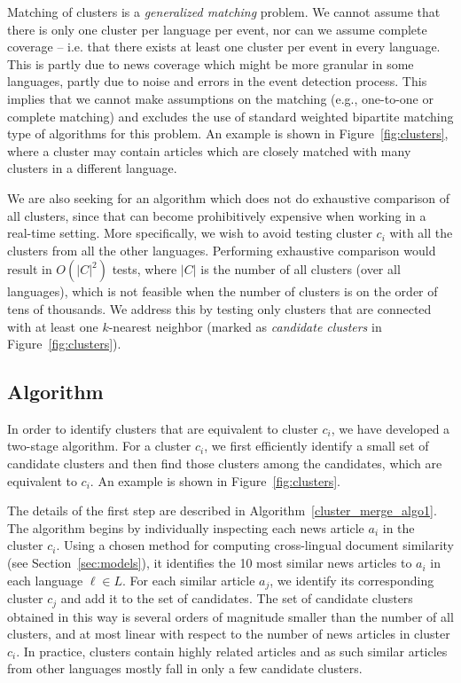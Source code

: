 \documentclass[twoside,11pt]{article}
\begin{document}
Matching of clusters is a \emph{generalized matching} problem. We cannot assume that there is only one cluster per language per event, nor can we assume complete coverage -- i.e. that there exists at least one cluster per event in every language. This is partly due to news coverage which might be more granular in some languages, partly due to noise and errors in the event detection process. This implies that we cannot make assumptions on the matching (e.g., one-to-one or complete matching) and excludes the use of standard weighted bipartite matching type of algorithms for this problem. An example is shown in Figure~\ref{fig:clusters}, where a cluster may contain articles which are closely matched with many clusters in a different language.

We are also seeking for an algorithm which does not do exhaustive comparison of all clusters, since that can become prohibitively expensive when working in a real-time setting. More specifically, we wish to avoid testing cluster $c_i$ with all the clusters from all the other languages. Performing exhaustive comparison would result in $O(|C|^2)$ tests, where $|C|$ is the number of all clusters (over all languages), which is not feasible when the number of clusters is on the order of tens of thousands. We address this by testing only clusters that are connected with at least one $k$-nearest neighbor (marked as \emph{candidate clusters} in Figure~\ref{fig:clusters}).

\subsection{Algorithm}\label{algo:features}

In order to identify clusters that are equivalent to cluster $c_i$, we have developed a two-stage algorithm. For a cluster $c_i$, we first efficiently identify a small set of candidate clusters and then find those clusters among the candidates, which are equivalent to $c_i$. An example is  shown in  Figure~\ref{fig:clusters}.

The details of the first step are described in Algorithm~\ref{cluster_merge_algo1}. The algorithm begins by individually inspecting each news article $a_i$ in the cluster $c_i$. Using a chosen method for computing cross-lingual document similarity (see Section~\ref{sec:models}), it identifies the 10 most similar news articles to $a_i$ in each language $\ell \in L$. For each similar article $a_j$, we identify its corresponding  cluster $c_j$ and add it to the set of candidates. The set of candidate clusters obtained in this way is several orders of magnitude smaller than the number of all clusters, and at most linear with respect to the number of news articles in cluster $c_i$. In practice, clusters contain highly related articles and as such similar articles from other languages mostly fall in only a few candidate clusters.
\end{document}
